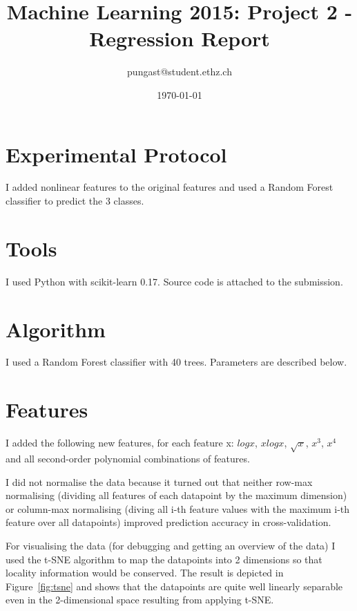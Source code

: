 \documentclass[a4paper, 11pt]{article}
\title{Machine Learning 2015: Project 2 - Regression Report}
\author{pungast@student.ethz.ch\\}
\date{\today}
\begin{document}
\maketitle

\section*{Experimental Protocol}
I added nonlinear features to the original features and used a Random Forest classifier to predict the 3 classes.

\section{Tools}
I used Python with scikit-learn 0.17. Source code is attached to the submission.

\section{Algorithm}
I used a Random Forest classifier with 40 trees. Parameters are described below.

\section{Features}
I added the following new features, for each feature x: $log x$, $x log x$, $\sqrt{x}$, $x^3$, $x^4$ and all second-order polynomial combinations of features.

I did not normalise the data because it turned out that neither row-max normalising (dividing all features of each datapoint by the maximum dimension) or column-max normalising (diving all i-th feature values with the maximum i-th feature over all datapoints) improved prediction accuracy in cross-validation.

For visualising the data (for debugging and getting an overview of the data) I used the t-SNE algorithm to map the datapoints into 2 dimensions so that locality information would be conserved. The result is depicted in Figure~\ref{fig:tsne} and shows that the datapoints are quite well linearly separable even in the 2-dimensional space resulting from applying t-SNE.
\end{document}
